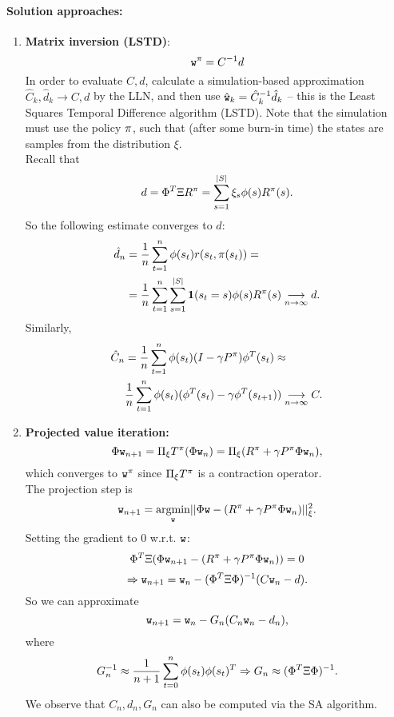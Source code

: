 \paragraph{Solution approaches:}
\begin{enumerate}
\item \textbf{Matrix inversion (LSTD)}: $$\texttt{w}^{\pi} = C^{-1}d$$
In order to evaluate $C,d$, calculate a simulation-based approximation $\hat{C}_k,\hat{d}_k \rightarrow C,d$ by the LLN, and then use $\hat{\texttt{w}}_k = \hat{C}_k^{-1} \hat{d}_k$ -- this is the Least Squares Temporal Difference algorithm (LSTD). Note that the simulation must use the policy $\pi$, such that (after some burn-in time) the states are samples from the distribution $\xi$.\\
Recall that
$$d = \Phi^T \Xi R^\pi = \sum_{s=1}^{|S|} \xi_s  {\phi}(s) R^\pi(s).$$
So the following estimate converges to $d$:
\begin{align*}
\hat{d}_n &= \frac{1}{n} \sum_{t=1}^n  {\phi}(s_t) r(s_t,\pi(s_t)) = \\
&= \frac{1}{n}\sum_{t=1}^n\sum_{s=1}^{|S|} {\bf1}(s_t=s) {\phi}(s) R^\pi(s) \underset{n\rightarrow \infty}{\longrightarrow} d .
\end{align*}
Similarly,
\begin{align*}
\hat{C}_n &= \frac{1}{n} \sum_{t=1}^n  {\phi}(s_t)(I-\gamma P^\pi) {\phi}^T(s_t) \approx \\
&\frac{1}{n} \sum_{t=1}^n {\phi}(s_t)( {\phi}^T(s_t)-\gamma {\phi}^T(s_{t+1}))  \underset{n\rightarrow \infty}{\longrightarrow} C .
\end{align*}

\item \textbf{Projected value iteration:}
$$\Phi \texttt{w}_{n+1} = \Pi_\xi T^\pi( \Phi \texttt{w}_n) = \Pi_\xi(R^\pi+\gamma P^\pi \Phi \texttt{w}_n),$$
which converges to $\texttt{w}^{\pi}$ since $\Pi_\xi T^\pi$ is a contraction operator.\\

The projection step is
$$ \texttt{w}_{n+1} = \underset{\texttt{w}}{\operatorname{argmin}}||\Phi \texttt{w} - (R^\pi+\gamma P^\pi \Phi \texttt{w}_n)||_\xi^2.$$
Setting the gradient to $0$ w.r.t. $\texttt{w}$:
$$\Phi^T \Xi(\Phi \texttt{w}_{n+1} - (R^\pi+\gamma P^\pi \Phi \texttt{w}_n)) = 0$$
$$\Rightarrow \texttt{w}_{n+1} = \texttt{w}_n - (\Phi^T\Xi\Phi)^{-1}(C \texttt{w}_n-d).$$
So we can approximate
$$\texttt{w}_{n+1} = \texttt{w}_n - G_n(C_n \texttt{w}_n -d_n),$$
where
$$G_n^{-1} \approx \frac{1}{n+1} \sum_{t=0}^n  {\phi}(s_t) {\phi}(s_t)^T \Rightarrow G_n \approx (\Phi^T \Xi \Phi)^{-1}.$$
We observe that $C_n,d_n,G_n$ can also be computed via the SA algorithm.


\end{enumerate}
